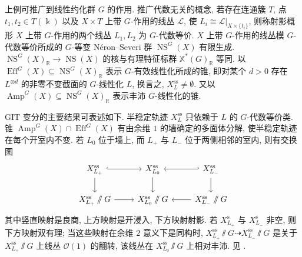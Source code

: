 \begin{remark}[GIT 变分]\label{src:8.5.9}
上例可推广到线性约化群 $G$ 的作用. 推广代数无关的概念, 若存在连通簇 $T$, 点 $t_1,t_2\in T(\Bbbk)$ 以及 $X\times T$ 上带 $G$-作用的线丛 $\mathcal L$, 使 $L_i\cong\mathcal L|_{X\times\{t_i\}}$, 则称射影概形 $X$ 上带 $G$-作用的两个线丛 $L_1,L_2$ 为 $G$-代数等价. $X$ 上带 $G$-作用的线丛模 $G$-代数等价所成的 $G$-等变 Néron--Severi 群 $\operatorname{NS}^G(X)$ 有限生成. $\operatorname{NS}^G(X)_{\mathbb R}\to\operatorname{NS}(X)$ 的核与有理特征标群 $\mathbb X^*(G)_{\mathbb R}$ 等同. 以 $\operatorname{Eff}^G(X)\subseteq\operatorname{NS}^G(X)_{\mathbb R}$ 表示 $G$-有效线性化所成的锥, 即对某个 $d>0$ 存在 $L^{\otimes d}$ 的非零不变截面的 $G$-线性化 $L$, 换言之, $X_L^{\mathrm{ss}}\ne\emptyset$. 又以 $\operatorname{Amp}^G(X)\subseteq\operatorname{NS}^G(X)_{\mathbb R}$ 表示丰沛 $G$-线性化的锥.

GIT 变分的主要结果可表述如下. 半稳定轨迹 $X_L^{\mathrm{ss}}$ 只依赖于 $L$ 的 $G$-代数等价类. 锥 $\operatorname{Amp}^G(X)\cap\operatorname{Eff}^G(X)$ 有由余维 $1$ 的墙确定的多面体分解, 使半稳定轨迹在每个开室内不变. 若 $L_0$ 位于墙上, 而 $L_+$ 与 $L_-$ 位于两侧相邻的室内, 则有交换图
\[
\begin{tikzcd}[ampersand replacement=\&]
X_{L_+}^{\mathrm{ss}}\arrow[r,hook]\arrow[d]\&X_{L_0}^{\mathrm{ss}}\arrow[d]\&X_{L_-}^{\mathrm{ss}}\arrow[l,hook']\arrow[d]\\
{X_{L_+}^{\mathrm{ss}}\sslash G}\arrow[r]\&{X_{L_0}^{\mathrm{ss}}\sslash G}\&{X_{L_-}^{\mathrm{ss}}\sslash G}\arrow[l]
\end{tikzcd}
\]
其中竖直映射是良商, 上方映射是开浸入, 下方映射射影. 若 $X_{L_+}^{\mathrm s}$ 与 $X_{L_-}^{\mathrm s}$ 非空, 则下方映射双有理; 当这些映射在余维 $2$ 意义下是同构时, $X_{L_+}^{\mathrm{ss}}\sslash G\dashrightarrow X_{L_-}^{\mathrm{ss}}\sslash G$ 是关于 $X_{L_+}^{\mathrm{ss}}\sslash G$ 上线丛 $\mathcal O(1)$ 的翻转, 该线丛在 $X_{L_0}^{\mathrm{ss}}\sslash G$ 上相对丰沛. 见 \cite{Tha96,DH98}.
\end{remark}
